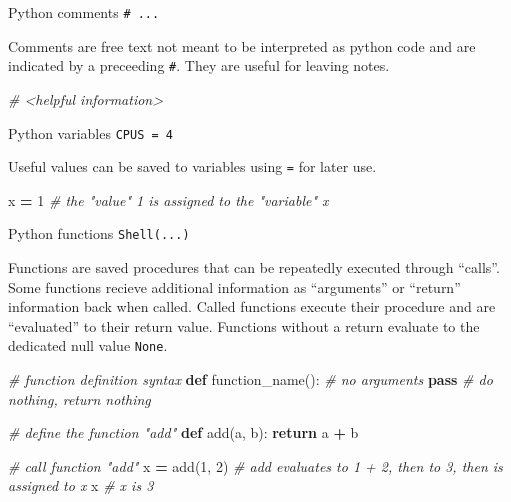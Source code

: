 \documentclass[
]{book}
\newenvironment{Shaded}{\begin{snugshade}}{\end{snugshade}}
\newcommand{\CommentTok}[1]{\textcolor[rgb]{0.56,0.35,0.01}{\textit{#1}}}
\newcommand{\ControlFlowTok}[1]{\textcolor[rgb]{0.13,0.29,0.53}{\textbf{#1}}}
\newcommand{\DecValTok}[1]{\textcolor[rgb]{0.00,0.00,0.81}{#1}}
\newcommand{\KeywordTok}[1]{\textcolor[rgb]{0.13,0.29,0.53}{\textbf{#1}}}
\newcommand{\NormalTok}[1]{#1}
\newcommand{\OperatorTok}[1]{\textcolor[rgb]{0.81,0.36,0.00}{\textbf{#1}}}
\begin{document}
Python comments \texttt{\#\ ...}

Comments are free text not meant to be interpreted as python code and are indicated by a preceeding \texttt{\#}.
They are useful for leaving notes.

\begin{Shaded}
\begin{Highlighting}[numbers=left,,]
\CommentTok{\# \textless{}helpful information\textgreater{}}
\end{Highlighting}
\end{Shaded}

Python variables \texttt{CPUS\ =\ 4}

Useful values can be saved to variables using \texttt{=} for later use.

\begin{Shaded}
\begin{Highlighting}[numbers=left,,]
\NormalTok{x }\OperatorTok{=} \DecValTok{1} \CommentTok{\# the "value" 1 is assigned to the "variable" x}
\end{Highlighting}
\end{Shaded}

Python functions \texttt{Shell(...)}

Functions are saved procedures that can be repeatedly executed through ``calls''.
Some functions recieve additional information as ``arguments'' or ``return'' information back when called.
Called functions execute their procedure and are ``evaluated'' to their return value.
Functions without a return evaluate to the dedicated null value \texttt{None}.

\begin{Shaded}
\begin{Highlighting}[numbers=left,,]
\CommentTok{\# function definition syntax}
\KeywordTok{def}\NormalTok{ function\_name(): }\CommentTok{\# no arguments}
    \ControlFlowTok{pass} \CommentTok{\# do nothing, return nothing}

\CommentTok{\# define the function "add"}
\KeywordTok{def}\NormalTok{ add(a, b):}
    \ControlFlowTok{return}\NormalTok{ a }\OperatorTok{+}\NormalTok{ b}

\CommentTok{\# call function "add"}
\NormalTok{x }\OperatorTok{=}\NormalTok{ add(}\DecValTok{1}\NormalTok{, }\DecValTok{2}\NormalTok{) }\CommentTok{\# add evaluates to 1 + 2, then to 3, then is assigned to x}
\NormalTok{x }\CommentTok{\# x is 3}
\end{Highlighting}
\end{Shaded}
\end{document}
